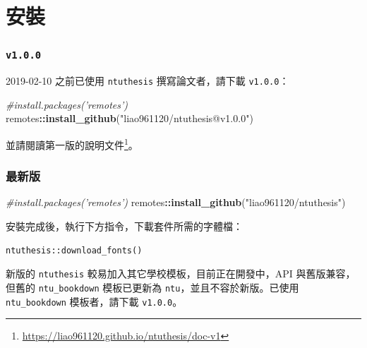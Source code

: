 \documentclass[oneside]{book}
\newenvironment{Shaded}{\begin{snugshade}}{\end{snugshade}}
\newcommand{\CommentTok}[1]{\textcolor[rgb]{0.56,0.35,0.01}{\textit{#1}}}
\newcommand{\KeywordTok}[1]{\textcolor[rgb]{0.13,0.29,0.53}{\textbf{#1}}}
\newcommand{\NormalTok}[1]{#1}
\newcommand{\OperatorTok}[1]{\textcolor[rgb]{0.81,0.36,0.00}{\textbf{#1}}}
\newcommand{\StringTok}[1]{\textcolor[rgb]{0.31,0.60,0.02}{#1}}
\renewcommand{\href}[2]{#2\footnote{\url{#1}}}
\theoremstyle{definition}
\theoremstyle{definition}
\theoremstyle{definition}
\theoremstyle{remark}
\begin{document}
\clearpage
{}

\hypertarget{install}{%
\chapter{安裝}\label{install}}

\hypertarget{v1.0.0}{%
\subsection*{\texorpdfstring{\texttt{v1.0.0}}{v1.0.0}}\label{v1.0.0}}

2019-02-10 之前已使用 \texttt{ntuthesis} 撰寫論文者，請下載 \texttt{v1.0.0}：

\begin{Shaded}
\begin{Highlighting}[]
\CommentTok{#install.packages('remotes')}
\NormalTok{remotes}\OperatorTok{::}\KeywordTok{install_github}\NormalTok{(}\StringTok{"liao961120/ntuthesis@v1.0.0"}\NormalTok{)}
\end{Highlighting}
\end{Shaded}

並請閱讀\href{https://liao961120.github.io/ntuthesis/doc-v1}{第一版的說明文件}。

\hypertarget{ux6700ux65b0ux7248}{%
\subsection*{最新版}\label{ux6700ux65b0ux7248}}

\begin{Shaded}
\begin{Highlighting}[]
\CommentTok{#install.packages('remotes')}
\NormalTok{remotes}\OperatorTok{::}\KeywordTok{install_github}\NormalTok{(}\StringTok{"liao961120/ntuthesis"}\NormalTok{)}
\end{Highlighting}
\end{Shaded}

安裝完成後，執行下方指令，下載套件所需的字體檔：

\begin{verbatim}
ntuthesis::download_fonts()
\end{verbatim}

新版的 \texttt{ntuthesis} 較易加入其它學校模板，目前正在開發中，API 與舊版兼容，但舊的 \texttt{ntu\_bookdown} 模板已更新為 \texttt{ntu}，並且不容於新版。已使用 \texttt{ntu\_bookdown} 模板者，請下載 \texttt{v1.0.0}。
\end{document}

